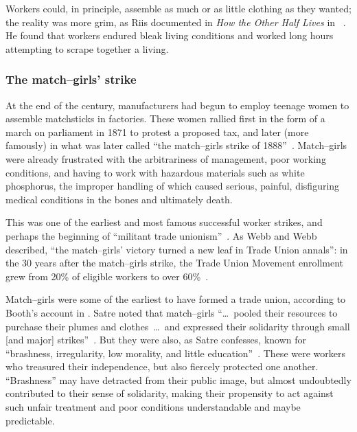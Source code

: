 \documentclass[pn4226]{subfiles}
\begin{document}
Workers could, in principle, assemble as much or as little clothing as they wanted;
the reality was more grim, as
Riis documented in \textit{How the Other Half Lives} in \citeyear{riisOtherSideLives}~\cite{riisOtherSideLives}.
He found that
workers endured bleak living conditions and
worked long hours attempting to scrape together a living.


\subsubsection{The match--girls' strike}

At the end of the  century,
manufacturers had begun to employ teenage women to assemble matchsticks in factories.
These women rallied first in the form of a march on parliament in 1871 to protest a proposed tax, and 
later (more famously) in what was later called ``the match--girls strike of 1888''~\cite{10.2307/3827491}.
Match--girls were already frustrated with
the arbitrariness of management,
poor working conditions, and
having to work with hazardous materials such as white phosphorus, the improper handling of which
caused serious, painful, disfiguring medical conditions in the bones and ultimately death.

This was one of the earliest and most famous successful worker strikes,
and perhaps the beginning of ``militant trade unionism''~\cite{10.2307/3827491}.
As Webb and Webb described,
``the match--girls' victory turned a new leaf in Trade Union annals'': in the 30 years after the match--girls strike,
the Trade Union Movement enrollment grew from 20\% of eligible workers to over 60\%~\cite{weyer1894history}.

Match--girls were some of the earliest to have formed a trade union,
according to Booth's account in \citeyear{booth1903life}. %
Satre noted that match--girls
``\dots~pooled their resources to purchase their plumes and clothes~\dots~and expressed their solidarity through small [and major] strikes''~\cite{booth1903life}.
But they were also, as Satre confesses, known for ``brashness, irregularity, low morality, and little education''~\cite{10.2307/3827491}.
These were workers who treasured their independence, but also fiercely protected one another. %
``Brashness'' may have detracted from their public image, but almost undoubtedly contributed to their sense of solidarity,
making their propensity to act against such unfair treatment and poor conditions understandable and maybe predictable.
\end{document}
